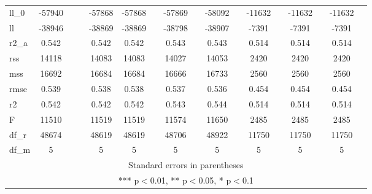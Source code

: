 \documentclass[]{article}
\begin{document}
\begin{tabular}{lcccccccccccccccc}
ll\_0 & -57940 &  &  & -57868 & -57868 &  & -57869 &  & -58092 &  & -11632 &  & -11632 &  & -11632 &  \\
ll & -38946 &  &  & -38869 & -38869 &  & -38798 &  & -38907 &  & -7391 &  & -7391 &  & -7391 &  \\
r2\_a & 0.542 &  &  & 0.542 & 0.542 &  & 0.543 &  & 0.543 &  & 0.514 &  & 0.514 &  & 0.514 &  \\
rss & 14118 &  &  & 14083 & 14083 &  & 14027 &  & 14053 &  & 2420 &  & 2420 &  & 2420 &  \\
mss & 16692 &  &  & 16684 & 16684 &  & 16666 &  & 16733 &  & 2560 &  & 2560 &  & 2560 &  \\
rmse & 0.539 &  &  & 0.538 & 0.538 &  & 0.537 &  & 0.536 &  & 0.454 &  & 0.454 &  & 0.454 &  \\
r2 & 0.542 &  &  & 0.542 & 0.542 &  & 0.543 &  & 0.544 &  & 0.514 &  & 0.514 &  & 0.514 &  \\
F & 11510 &  &  & 11519 & 11519 &  & 11574 &  & 11650 &  & 2485 &  & 2485 &  & 2485 &  \\
df\_r & 48674 &  &  & 48619 & 48619 &  & 48706 &  & 48922 &  & 11750 &  & 11750 &  & 11750 &  \\
 df\_m & 5 &  &  & 5 & 5 &  & 5 &  & 5 &  & 5 &  & 5 &  & 5 &  \\ \hline
\multicolumn{17}{c}{ Standard errors in parentheses} \\
\multicolumn{17}{c}{ *** p$<$0.01, ** p$<$0.05, * p$<$0.1} \\
\end{tabular}
\end{document}
